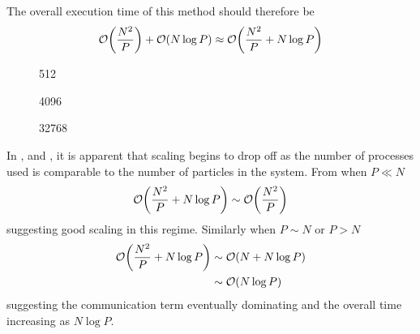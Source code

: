 %
The overall execution time of this method should therefore be
\begin{equation}
    \mathcal{O}{\left({ \frac{N^2}{P} }\right)} + \mathcal{O}{\left({ N\log{P} }\right)}
        \approx{} \mathcal{O}{\left({ \frac{N^2}{P} + N\log{P} }\right)}
        \label{eqn:v0_replicated_pair_operation_overall_time}
\end{equation}


%
%
\begin{figure}[!h]
    
    \caption{
        \vZeroTimeCaption
            {\replicateddata{}}
            {\pairoperation{}}
            {512}
    }
    \label{fig:v0_replicated_pair_operation_512_logtime}
\end  {figure}

\begin{figure}[!h]
    
    \caption{
        \vZeroTimeCaption
            {\replicateddata{}}
            {\pairoperation{}}
            {4096}
    }
    \label{fig:v0_replicated_pair_operation_4096_logtime}
\end  {figure}

\begin{figure}[!h]
    
    \caption{
        \vZeroTimeCaption
            {\replicateddata{}}
            {\pairoperation{}}
            {32768}
    }
    \label{fig:v0_replicated_pair_operation_32768_logtime}
\end  {figure}

\vZeroTimeExplanation
    {}
    {}
    {}
    {\pairoperation{}}
    {\replicateddata{}}

%
In ,
 and
,
it is apparent that scaling begins to drop off as the number
of processes used is comparable to the number of particles in the system.
%
From  when $P \ll{} N$
\begin{equation}
    \mathcal{O}{\left({ \frac{N^2}{P} + N\log{P} }\right)} \sim{} \mathcal{O}{\left({ \frac{N^2}{P} }\right)}
\end  {equation}
suggesting good scaling in this regime.
%
Similarly when $P \sim{} N$
or $P > N$
\begin{equation}
    \begin{split}
        \mathcal{O}{\left({ \frac{N^2}{P} + N\log{P} }\right)}
            &\sim{} \mathcal{O}{\left({ N + N\log{P} }\right)} \\
            &\sim{} \mathcal{O}{\left({ N\log{P} }\right)}
    \end{split}
\end{equation}
%
suggesting the communication term eventually dominating and
the overall time increasing as $N\log{P}$.

